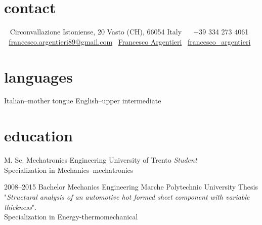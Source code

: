 \documentclass[]{friggeri-cv} %
\newcommand{\LinkedinColour}{{\color{linkedin} \faLinkedin}}
\newcommand{\Email}{{\color{black} \faEnvelope \,}}
\newcommand{\Skype}{{\color{skypeblue} \faSkype}}
\newcommand{\Phone}{{\color{phonegreen} \faPhone}}
\begin{document}


\begin{aside} %
\section{contact}
~
Circonvallazione Istoniense, 20
Vasto (CH), 66054
Italy
~
\Phone \, +39 334 273 4061
~
\Email \, \href{mailto:francesco.argentieri89@gmail.com}{francesco.argentieri89@gmail.com}
\LinkedinColour \, \href{https://it.linkedin.com/in/francesco-argentieri}{Francesco Argentieri}
\Skype \, \href{skype:my_username?add}{francesco\_argentieri}
\section{languages}
Italian--mother tongue
English--upper intermediate
\end{aside}


\section{education}

\begin{entrylist}


{M. Sc. {\normalfont Mechatronics Engineering}}
{University of Trento}
{\emph{Student}\\ Specialization in Mechanics--mechatronics}


\entry
{2008--2015}
{Bachelor {\normalfont Mechanics Engineering}}
{Marche Polytechnic University}
{Thesis "\emph{Structural analysis of an automotive hot formed sheet component with variable thickness}".\\
Specialization in Energy-thermomechanical}


\end{entrylist}
\end{document}
